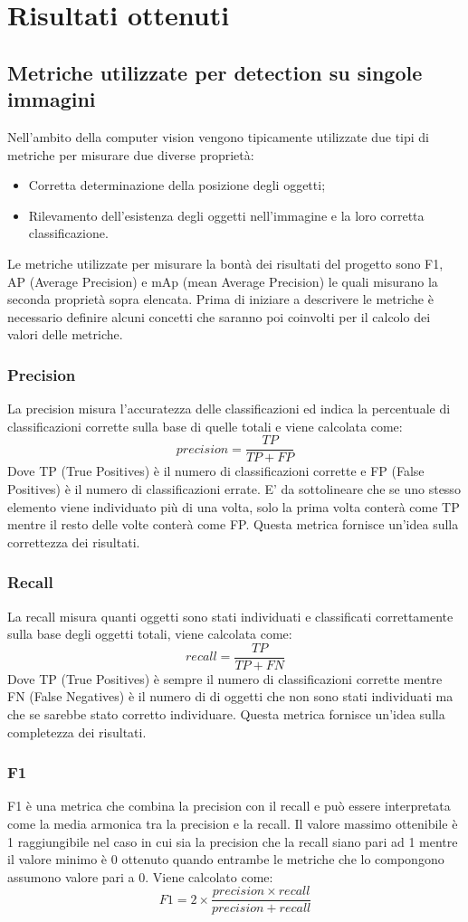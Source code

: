 \section{Risultati ottenuti}
\subsection{Metriche utilizzate per detection su singole immagini}
Nell'ambito della computer vision vengono tipicamente utilizzate due tipi di metriche per misurare due diverse proprietà:
\begin{itemize}
\item Corretta determinazione della posizione degli oggetti;
\item Rilevamento dell'esistenza degli oggetti nell'immagine e la loro corretta classificazione.
\end{itemize}
Le metriche utilizzate per misurare la bontà dei risultati del progetto sono F1, AP (Average Precision) e mAp (mean Average Precision) le quali misurano la seconda proprietà sopra elencata.
Prima di iniziare a descrivere le metriche è necessario definire alcuni concetti che saranno poi coinvolti per il calcolo dei valori delle metriche.
\subsubsection{Precision}
La precision misura l'accuratezza delle classificazioni ed indica la percentuale di classificazioni corrette sulla base di quelle totali e viene calcolata come:
\[
    precision = \frac{TP}{TP + FP}
\]
Dove TP (True Positives) è il numero di classificazioni corrette e FP (False Positives) è il numero di classificazioni errate. E' da sottolineare che se uno stesso elemento viene individuato più di una volta, solo la prima volta conterà come TP mentre il resto delle volte conterà come FP. Questa metrica fornisce un'idea sulla correttezza dei risultati.
\subsubsection{Recall}
La recall misura quanti oggetti sono stati individuati e classificati correttamente sulla base degli oggetti totali, viene calcolata come:
\[
    recall = \frac{TP}{TP + FN}
\]
Dove TP (True Positives) è sempre il numero di classificazioni corrette mentre FN (False Negatives) è il numero di di oggetti che non sono stati individuati ma che se sarebbe stato corretto individuare. Questa metrica fornisce un'idea sulla completezza dei risultati.
\subsubsection{F1}
F1 è una metrica che combina la precision con il recall e può essere interpretata come la media armonica tra la precision e la recall. Il valore massimo ottenibile è 1 raggiungibile nel caso in cui sia la precision che la recall siano pari ad 1 mentre il valore minimo è 0 ottenuto quando entrambe le metriche che lo compongono assumono valore pari a 0. Viene calcolato come:
\[
    F1 = 2 \times \frac{precision \times recall}{precision + recall}
\]
